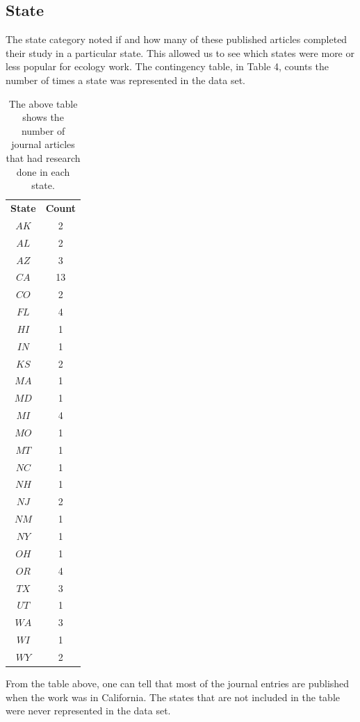 \documentclass[12pt, letterpaper]{article}
\begin{document}
\subsection{State}
The state category noted if and how many of these published articles completed their study in a particular state. This allowed us to see which states were more or less popular for ecology work. The contingency table, in Table 4, counts the number of times a state was represented in the data set. 
\begin{table}[!h]
\begin{center}
\begin{tabular}{|c|c|}
\textbf{State} & \textbf{Count}\\
$AK$ & 2\\
$AL$ &  2\\
$AZ$ &  3\\
$CA$ & 13\\
$CO$ & 2\\
$FL$ & 4\\
$HI$ & 1\\
$IN$ & 1\\
$KS$ & 2\\
$MA$ & 1\\
$MD$ &  1\\
$MI$ &  4\\
$MO$ & 1\\
$MT$ & 1\\
$NC$ & 1\\
$NH$ & 1\\
$NJ$ & 2\\
$NM$ & 1\\
$NY$ & 1\\
$OH$ &  1\\
$OR$ &  4\\
$TX$ & 3\\
$UT$ & 1\\
$WA$ & 3\\
$WI$ & 1\\
$WY$ & 2\\
\end{tabular}
\end{center}
\label{fig: State Contingency Table}
\caption{The above table shows the number of journal articles that had research done in each state.}
\end{table}

From the table above, one can tell that most of the journal entries are published when the work was in California. The states that are not included in the table were never represented in the data set. 
\end{document}
